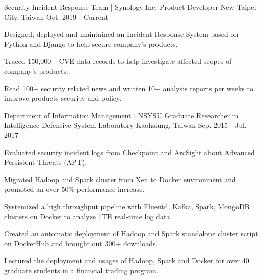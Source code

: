 


\begin{cventries}


\cventry
{Security Incident Response Team | Synology Inc.} %
{Product Developer} %
{New Taipei City, Taiwan} %
{Oct. 2019 - Current} %
{ %
\begin{cvitems}
\item {Designed, deployed and maintained an Incident Response System based on Python and Django to help secure company's products.}
\item {Traced 150,000+ CVE data records to help investigate affected scopes of company's products.}
\item {Read 100+ security related news and written 10+ analysis reports per weeks to improve products security and policy.}
\end{cvitems}
}


\cventry
{Department of Information Management | NSYSU} %
{Graduate Researcher in Intelligence Defensive System Laboratory} %
{Kaohsiung, Taiwan} %
{Sep. 2015 - Jul. 2017} %
{ %
\begin{cvitems}
\item {Evaluated security incident logs from Checkpoint and ArcSight about Advanced Persistent Threats (APT).}
\item {Migrated Hadoop and Spark cluster from Xen to Docker environment and promoted an over 50\% performance increase.}
\item {Systemized a high throughput pipeline with Fluentd, Kafka, Spark, MongoDB clusters on Docker to analyze 1TB real-time log data.}
\item {Created an automatic deployment of Hadoop and Spark standalone cluster script on DockerHub and brought out 300+ downloads.}
\item {Lectured the deployment and usages of Hadoop, Spark and Docker for over 40 graduate students in a financial trading program.}
\end{cvitems}
}


\end{cventries}
